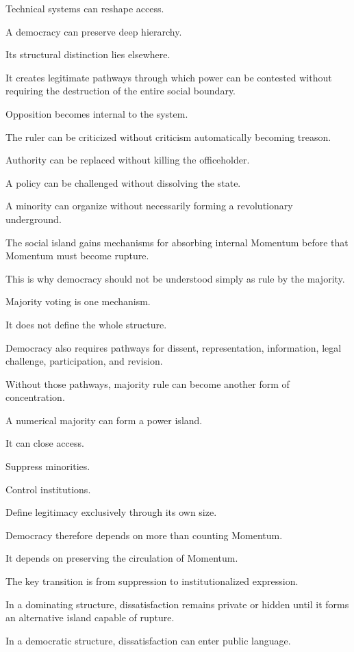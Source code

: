 Technical systems can reshape access.

A democracy can preserve deep hierarchy.

Its structural distinction lies elsewhere.

It creates legitimate pathways through which power can be contested without requiring the destruction of the entire social boundary.

Opposition becomes internal to the system.

The ruler can be criticized without criticism automatically becoming treason.

Authority can be replaced without killing the officeholder.

A policy can be challenged without dissolving the state.

A minority can organize without necessarily forming a revolutionary underground.

The social island gains mechanisms for absorbing internal Momentum before that Momentum must become rupture.

This is why democracy should not be understood simply as rule by the majority.

Majority voting is one mechanism.

It does not define the whole structure.

Democracy also requires pathways for dissent, representation, information, legal challenge, participation, and revision.

Without those pathways, majority rule can become another form of concentration.

A numerical majority can form a power island.

It can close access.

Suppress minorities.

Control institutions.

Define legitimacy exclusively through its own size.

Democracy therefore depends on more than counting Momentum.

It depends on preserving the circulation of Momentum.

The key transition is from suppression to institutionalized expression.

In a dominating structure, dissatisfaction remains private or hidden until it forms an alternative island capable of rupture.

In a democratic structure, dissatisfaction can enter public language.

